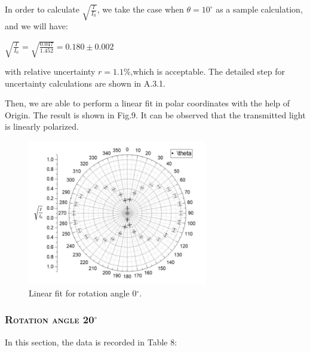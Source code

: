 \documentclass[a4paper,12pt]{article}
\begin{document}
In order to calculate $\displaystyle \sqrt{\frac{I}{I_0}}$, we take the case when $\theta = 10^{\circ}$ as a sample calculation, and we will have:
\begin{center}
$\displaystyle \sqrt{\frac{I}{I_0}} = \sqrt{\frac{0.047}{1.452}} = 0.180 \pm 0.002$
\end{center}

with relative uncertainty $\displaystyle r = 1.1\% $,which is acceptable. The detailed step for uncertainty calculations are shown in A.3.1.

\newpage
\par Then, we are able to perform a linear fit in polar coordinates with the help of Origin. The result is shown in Fig.9. It can be observed that the transmitted light is linearly polarized.

\begin{figure}[htb] 
    \centering
    \includegraphics[width=0.7\textwidth]{p1n} 
    \caption{Linear fit for rotation angle 0$^{\circ}$.} 
\end{figure}
\newpage




\subsubsection{\textsc{Rotation angle 20$^\circ$}}
In this section, the data is recorded in Table 8:
\end{document}
